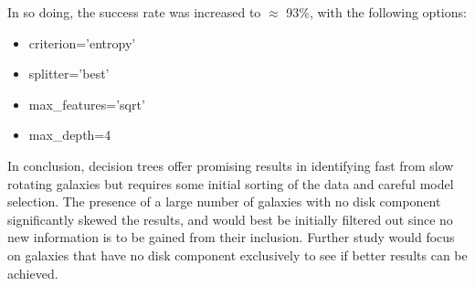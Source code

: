 In so doing, the success rate was increased to $\approx$ 93\%, with the following options:
\begin{itemize}
	\item criterion='entropy'
	\item splitter='best'
	\item max\_features='sqrt'
	\item max\_depth=4
\end{itemize}
In conclusion, decision trees offer promising results in identifying fast from slow rotating galaxies but requires some initial sorting of the data and careful model selection. The presence of a large number of galaxies with no disk component significantly skewed the results, and would best be initially filtered out since no new information is to be gained from their inclusion. Further study would focus on galaxies that have no disk component exclusively to see if better results can be achieved.